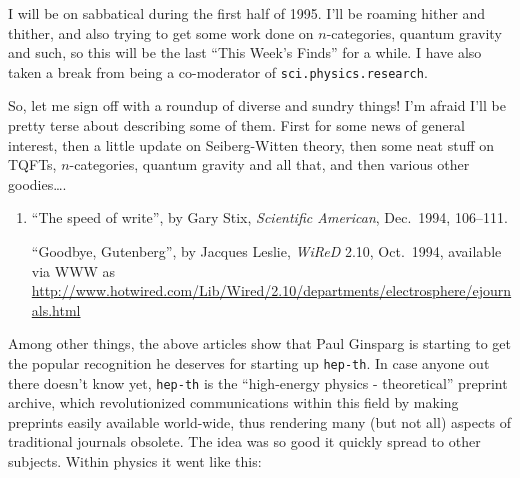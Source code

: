 \documentclass{article}
\begin{document}
I will be on sabbatical during the first half of 1995. I'll be roaming
hither and thither, and also trying to get some work done on
\(n\)-categories, quantum gravity and such, so this will be the last
``This Week's Finds'' for a while. I have also taken a break from being
a co-moderator of \texttt{sci.physics.research}.

So, let me sign off with a roundup of diverse and sundry things! I'm
afraid I'll be pretty terse about describing some of them. First for
some news of general interest, then a little update on Seiberg-Witten
theory, then some neat stuff on TQFTs, \(n\)-categories, quantum gravity
and all that, and then various other goodies\ldots.

\begin{enumerate}
\def\labelenumi{\arabic{enumi})}
\item
  ``The speed of write'', by Gary Stix, \emph{Scientific American},
  Dec.~1994, 106--111.

  ``Goodbye, Gutenberg'', by Jacques Leslie, \emph{WiReD} 2.10,
  Oct.~1994, available via WWW as
  \url{http://www.hotwired.com/Lib/Wired/2.10/departments/electrosphere/ejournals.html}
\end{enumerate}

Among other things, the above articles show that Paul Ginsparg is
starting to get the popular recognition he deserves for starting up
\texttt{hep-th}. In case anyone out there doesn't know yet,
\texttt{hep-th} is the ``high-energy physics - theoretical'' preprint
archive, which revolutionized communications within this field by making
preprints easily available world-wide, thus rendering many (but not all)
aspects of traditional journals obsolete. The idea was so good it
quickly spread to other subjects. Within physics it went like this:
\end{document}
